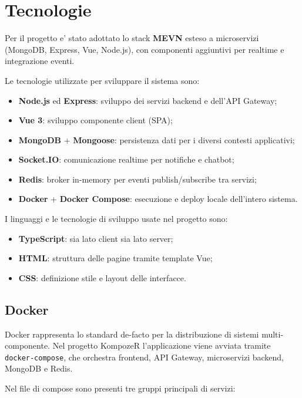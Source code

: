 \section{Tecnologie}

Per il progetto e' stato adottato lo stack \textbf{MEVN} esteso a microservizi (MongoDB, Express, Vue, Node.js), con componenti aggiuntivi per realtime e integrazione eventi.

Le tecnologie utilizzate per sviluppare il sistema sono:

\begin{itemize}
	\item \textbf{Node.js} ed \textbf{Express}: sviluppo dei servizi backend e dell'API Gateway;
	\item \textbf{Vue 3}: sviluppo componente client (SPA);
	\item \textbf{MongoDB} + \textbf{Mongoose}: persistenza dati per i diversi contesti applicativi;
	\item \textbf{Socket.IO}: comunicazione realtime per notifiche e chatbot;
	\item \textbf{Redis}: broker in-memory per eventi publish/subscribe tra servizi;
	\item \textbf{Docker} + \textbf{Docker Compose}: esecuzione e deploy locale dell'intero sistema.
\end{itemize}

I linguaggi e le tecnologie di sviluppo usate nel progetto sono:

\begin{itemize}
	\item \textbf{TypeScript}: sia lato client sia lato server;
	\item \textbf{HTML}: struttura delle pagine tramite template Vue;
	\item \textbf{CSS}: definizione stile e layout delle interfacce.
\end{itemize}

\subsection{Docker}

Docker rappresenta lo standard de-facto per la distribuzione di sistemi multi-componente. 
Nel progetto KompozeR l'applicazione viene avviata tramite \texttt{docker-compose}, che orchestra frontend, API Gateway, microservizi backend, MongoDB e Redis.

Nel file di compose sono presenti tre gruppi principali di servizi:

